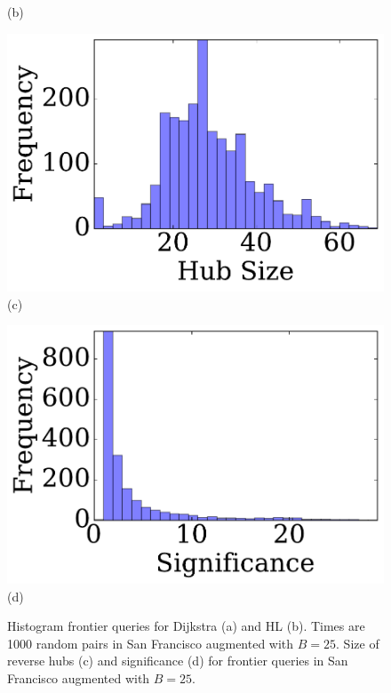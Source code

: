 \begin{figure}
\begin{minipage}[t]{.24\textwidth}
(b)
\end{minipage}%
\begin{minipage}[t]{.24\textwidth}
\centering
\includegraphics[clip, trim = 1.3cm 0.3cm 0cm 0cm,scale=0.225]{TexImg/SF_bwd_hub_size.pdf}
(c)
\end{minipage}%
\begin{minipage}[t]{.24\textwidth}
\centering
\includegraphics[clip, trim = 1.3cm 0.3cm 0cm 0cm,scale=0.225]{TexImg/significance.pdf}
(d)
\end{minipage}
\caption{ Histogram frontier queries for Dijkstra (a) and HL (b). Times are 1000 random pairs in San Francisco augmented with $B=25$.
Size of reverse hubs (c) and significance (d) for frontier queries in San Francisco augmented with $B=25$.
}
\label{fig:SF_query}
\label{fig:SF_bwd_size}
\end{figure}

